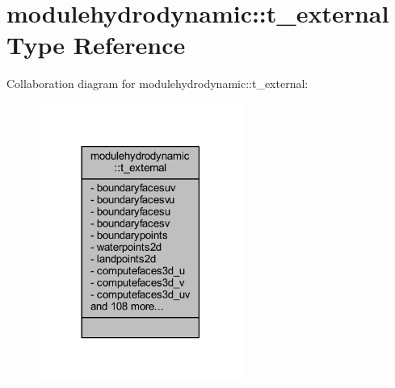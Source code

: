 \hypertarget{structmodulehydrodynamic_1_1t__external}{}\section{modulehydrodynamic\+:\+:t\+\_\+external Type Reference}
\label{structmodulehydrodynamic_1_1t__external}


Collaboration diagram for modulehydrodynamic\+:\+:t\+\_\+external\+:\nopagebreak
\begin{figure}[H]
\begin{center}
\leavevmode
\includegraphics[width=189pt]{structmodulehydrodynamic_1_1t__external__coll__graph}
\end{center}
\end{figure}
